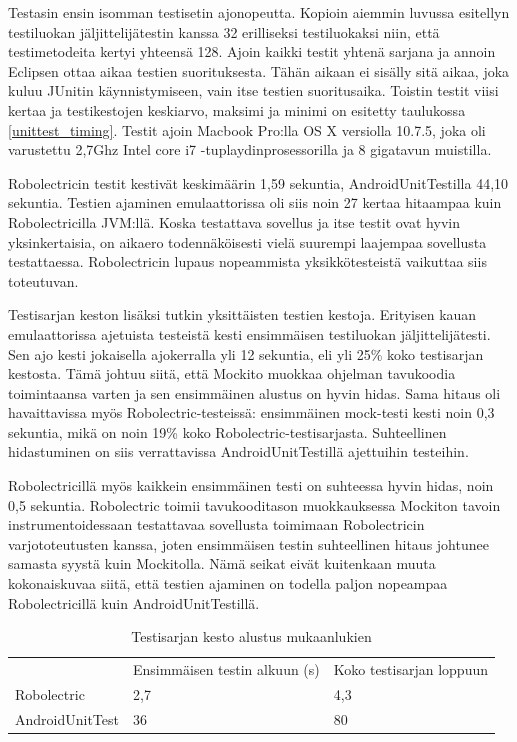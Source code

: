 Testasin ensin isomman testisetin ajonopeutta. Kopioin aiemmin luvussa esitellyn testiluokan jäljittelijätestin kanssa 32 erilliseksi testiluokaksi niin, että testimetodeita kertyi yhteensä 128. Ajoin kaikki testit yhtenä sarjana ja annoin Eclipsen ottaa aikaa testien suorituksesta. Tähän aikaan ei sisälly sitä aikaa, joka kuluu JUnitin käynnistymiseen, vain itse testien suoritusaika. Toistin testit viisi kertaa ja testikestojen keskiarvo, maksimi ja minimi on esitetty taulukossa \ref{unittest_timing}. Testit ajoin Macbook Pro:lla OS X versiolla 10.7.5, joka oli varustettu 2,7Ghz Intel core i7 -tuplaydinprosessorilla ja 8 gigatavun muistilla.

Robolectricin testit kestivät keskimäärin 1,59 sekuntia, AndroidUnitTestilla 44,10 sekuntia. Testien ajaminen emulaattorissa oli siis noin 27 kertaa hitaampaa kuin Robolectricilla JVM:llä. Koska testattava sovellus ja itse testit ovat hyvin yksinkertaisia, on aikaero todennäköisesti vielä suurempi laajempaa sovellusta testattaessa. Robolectricin lupaus nopeammista yksikkötesteistä vaikuttaa siis toteutuvan.

Testisarjan keston lisäksi tutkin yksittäisten testien kestoja. Erityisen kauan emulaattorissa ajetuista testeistä kesti ensimmäisen testiluokan jäljittelijätesti. Sen ajo kesti jokaisella ajokerralla yli 12 sekuntia, eli yli 25\% koko testisarjan kestosta. Tämä johtuu siitä, että Mockito muokkaa ohjelman tavukoodia toimintaansa varten ja sen ensimmäinen alustus on hyvin hidas. Sama hitaus oli havaittavissa myös Robolectric-testeissä: ensimmäinen mock-testi kesti noin 0,3 sekuntia, mikä on noin 19\% koko Robolectric-testisarjasta. Suhteellinen hidastuminen on siis verrattavissa AndroidUnitTestillä ajettuihin testeihin.

Robolectricillä myös kaikkein ensimmäinen testi on suhteessa hyvin hidas, noin 0,5 sekuntia. Robolectric toimii tavukooditason muokkauksessa Mockiton tavoin instrumentoidessaan testattavaa sovellusta toimimaan Robolectricin varjototeutusten kanssa, joten ensimmäisen testin suhteellinen hitaus johtunee samasta syystä kuin Mockitolla.
Nämä seikat eivät kuitenkaan muuta kokonaiskuvaa siitä, että testien ajaminen on todella paljon nopeampaa Robolectricillä kuin AndroidUnitTestillä.

\begin{table}[h]
\centering
\begin{tabular}{ l l l }
   & Ensimmäisen testin alkuun (s) & Koko testisarjan loppuun \\
  Robolectric & 2,7 & 4,3 \\
  AndroidUnitTest & 36 & 80 \\
\end{tabular}
\caption{Testisarjan kesto alustus mukaanlukien}
\label{unittest_startup}
\end{table}

